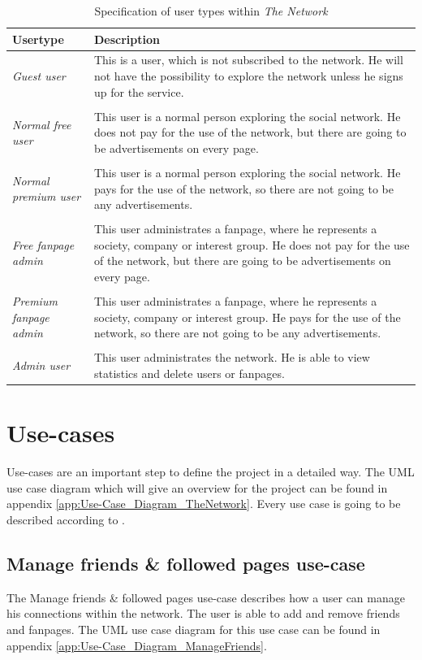 \documentclass[11pt,a4paper]{report}
\begin{document}
\begin{table}
    \begin{tabularx}{\textwidth}{l | X}
        Usertype & Description \\ \hline
        \emph{Guest user} & This is a user, which is not subscribed to the network. He will not have the possibility to explore the network unless he signs up for the service. \\
        \\
        \emph{Normal free user} & This user is a normal person exploring the social network. He does not pay for the use of the network, but there are going to be advertisements on every page. \\
        \\
        \emph{Normal premium user} & This user is a normal person exploring the social network. He pays for the use of the network, so there are not going to be any advertisements. \\
        \\
        \emph{Free fanpage admin} & This user administrates a fanpage, where he represents a society, company or interest group. He does not pay for the use of the network, but there are going to be advertisements on every page. \\
        \\
        \emph{Premium fanpage admin} & This user administrates a fanpage, where he represents a society, company or interest group. He pays for the use of the network, so there are not going to be any advertisements. \\
        \\
        \emph{Admin user} & This user administrates the network. He is able to view statistics and delete users or fanpages.\\
    \end{tabularx}
\caption{Specification of user types within \emph{The Network}}
\label{tab:usertypes}
\end{table}

\section{Use-cases}
Use-cases are an important step to define the project in a detailed way. The UML use case diagram which will give an overview for the project can be found in appendix \vref{app:Use-Case_Diagram_TheNetwork}. Every use case is going to be described according to \textcite{Cockburn:2001aa}.

\subsection{Manage friends \& followed pages use-case}
The Manage friends \& followed pages use-case describes how a user can manage his connections within the network. The user is able to add and remove friends and fanpages. The UML use case diagram for this use case can be found in appendix \vref{app:Use-Case_Diagram_ManageFriends}.
\end{document}
